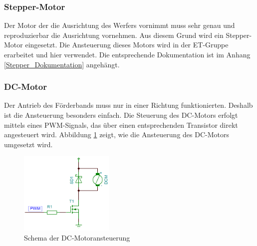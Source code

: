 \subsubsection{Stepper-Motor}
    Der Motor der die Ausrichtung des Werfers vornimmt muss sehr genau und reproduzierbar die Ausrichtung vornehmen. Aus diesem Grund wird ein Stepper-Motor eingesetzt. Die Ansteuerung dieses Motors wird in der ET-Gruppe erarbeitet und hier verwendet. Die entsprechende Dokumentation ist im Anhang \ref{Stepper_Dokumentation} angehängt.
\subsubsection{DC-Motor}
    Der Antrieb des Förderbands muss nur in einer Richtung funktionierten. Deshalb ist die Ansteuerung besonders einfach. Die Steuerung des DC-Motors erfolgt mittels eines PWM-Signals, das über einen entsprechenden Transistor direkt angesteuert wird. Abbildung \ref{fig:Schema_DC-Motor} zeigt, wie die Ansteuerung des DC-Motors umgesetzt wird.
    \begin{figure}[h!] %
    	\centering
    	\includegraphics[width=0.4\textwidth]{Enddokumentation/Loesungskonzept/Bilder/SchemaDcMotor.png}
    	\caption{Schema der DC-Motoransteuerung}
    	\label{fig:Schema_DC-Motor}
    \end{figure}
